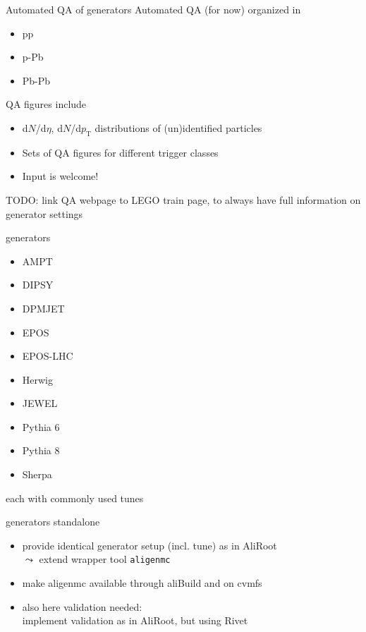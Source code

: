 \documentclass[table]{beamer}
\begin{document}
\begin{frame}{Automated QA of generators}
    Automated QA (for now) organized in
\begin{itemize}
    \item pp
    \item p-Pb
    \item Pb-Pb
\end{itemize}
\vspace{.5cm}

QA figures include
\begin{itemize}
    \item d$N$/d$\eta$, d$N$/d$p_{\text{T}}$ distributions of (un)identified particles
    \item Sets of QA figures for different trigger classes 
    \item Input is welcome!
\end{itemize}
\vspace{.5cm}

TODO: link QA webpage to LEGO train page, to always have full information on generator settings
\end{frame}


\begin{frame}{generators}
  \begin{itemize}
    \setlength{\itemsep}{.25cm}
  \item AMPT
  \item DIPSY
  \item DPMJET
  \item EPOS
  \item EPOS-LHC
  \item Herwig
  \item JEWEL
  \item Pythia 6
  \item Pythia 8
  \item Sherpa
  \end{itemize}
  each with commonly used tunes
\end{frame}

\begin{frame}{generators standalone}
  \begin{itemize}
    \setlength{\itemsep}{.25cm}
  \item provide identical generator setup (incl. tune) as in AliRoot\\
    $\leadsto$ extend wrapper tool \texttt{aligenmc}
  \item make aligenmc available through aliBuild and on cvmfs
  \item also here validation needed:\\
    implement validation as in AliRoot, but using Rivet
  \end{itemize}
\end{frame}
\end{document}
